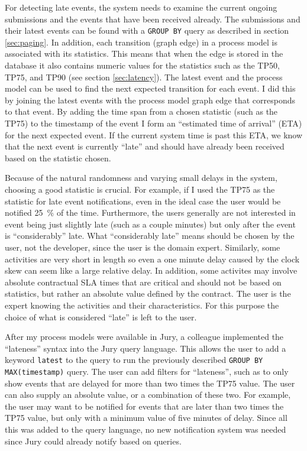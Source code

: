 For detecting late events, the system needs to examine the current ongoing submissions and the events that have been received already.
The submissions and their latest events can be found with a \texttt{GROUP BY} query as described in section \ref{sec:paging}.
In addition, each transition (graph edge) in a process model is associated with its statistics. 
This means that when the edge is stored in the database it also contains numeric values for the statistics such as the TP50, TP75, and TP90 (see section \ref{sec:latency}).
The latest event and the process model can be used to find the next expected transition for each event.
I did this by joining the latest events with the process model graph edge that corresponds to that event.
By adding the time span from a chosen statistic (such as the TP75) to the timestamp of the event I form an ``estimated time of arrival'' (ETA) for the next expected event.
If the current system time is past this ETA, we know that the next event is currently ``late'' and should have already been received based on the statistic chosen.

Because of the natural randomness and varying small delays in the system, choosing a good statistic is crucial. 
For example, if I used the TP75 as the statistic for late event notifications, even in the ideal case the user would be notified 25~\% of the time.
Furthermore, the users generally are not interested in event being just slightly late (such as a couple minutes) but only after the event is ``considerably'' late.
What ``considerably late'' means should be chosen by the user, not the developer, since the user is the domain expert.
Similarly, some activities are very short in length so even a one minute delay caused by the clock skew can seem like a large relative delay.
In addition, some activites may involve absolute contractual SLA times that are critical and should not be based on statistics, but rather an absolute value defined by the contract.
The user is the expert knowing the activities and their characteristics.
For this purpose the choice of what is considered ``late'' is left to the user.

After my process models were available in Jury, a colleague implemented the ``lateness'' syntax into the Jury query language. 
This allows the user to add a keyword \texttt{latest} to the query to run the previously described \texttt{GROUP BY MAX(timestamp)} query.
The user can add filters for ``lateness'', such as to only show events that are delayed for more than two times the TP75 value.
The user can also supply an absolute value, or a combination of these two.
For example, the user may want to be notified for events that are later than two times the TP75 value, but only with a minimum value of five minutes of delay.
Since all this was added to the query language, no new notification system was needed since Jury could already notify based on queries.

